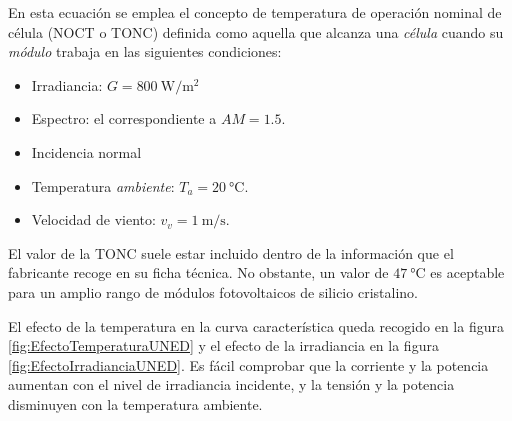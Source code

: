 En esta ecuación se emplea el concepto de temperatura de operación
nominal de célula (NOCT o TONC) definida como aquella que alcanza
una \emph{célula} cuando su \emph{módulo} trabaja en las siguientes
condiciones:
\needspace{5\onelineskip}
\begin{itemize}
\item Irradiancia: $G=\SI{800}{\watt\per\meter\squared}$
\item Espectro: el correspondiente a $AM=1.5$.
\item Incidencia normal
\item Temperatura \emph{ambiente}: $T_{a}=\SI{20}{\celsius}$.
\item Velocidad de viento: $v_{v}=\SI{1}{\meter\per\second}$.
\end{itemize}
El valor de la TONC suele estar incluido dentro de la información
que el fabricante recoge en su ficha técnica. No obstante, un valor
de $\SI{47}{\celsius}$ es aceptable para un amplio rango de módulos
fotovoltaicos de silicio cristalino.

El efecto de la temperatura en la curva característica queda recogido
en la figura \ref{fig:EfectoTemperaturaUNED} y el efecto de la irradiancia
en la figura \ref{fig:EfectoIrradianciaUNED}. Es fácil comprobar
que la corriente y la potencia aumentan con el nivel de irradiancia
incidente, y la tensión y la potencia disminuyen con la temperatura
ambiente.


